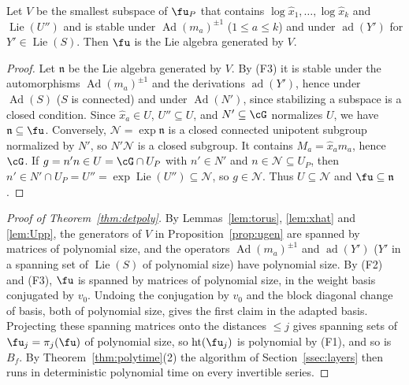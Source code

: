 \begin{proposition}\label{prop:ugen}
Let $V$ be the smallest subspace of $\fu_P$ that contains $\log\hat x_1,\ldots,\log\hat x_k$ and
$\operatorname{Lie}(U'')$ and is stable under $\operatorname{Ad}(m_a)^{\pm1}$ ($1\le a\le k$) and under $\operatorname{ad}(Y')$ for $Y'\in\operatorname{Lie}(S)$.
Then $\fu$ is the Lie algebra generated by $V$.
\end{proposition}
\begin{proof}
Let $\mathfrak n$ be the Lie algebra generated by $V$. By (F3) it is stable under the automorphisms
$\operatorname{Ad}(m_a)^{\pm1}$ and the derivations $\operatorname{ad}(Y')$, hence under $\operatorname{Ad}(S)$ ($S$ is connected) and under
$\operatorname{Ad}(N')$, since stabilizing a subspace is a closed condition. Since $\hat x_a\in U$, $U''\subseteq U$, and
$N'\subseteq\cG$ normalizes $U$, we have $\mathfrak n\subseteq\fu$. Conversely, $\mathcal N=\exp\mathfrak n$ is a closed
connected unipotent subgroup normalized by $N'$, so $N'\mathcal N$ is a closed subgroup. It contains
$M_a=\hat x_am_a$, hence $\cG$. If $g=n'n\in U=\cG\cap U_P$ with $n'\in N'$ and $n\in\mathcal N\subseteq U_P$, then
$n'\in N'\cap U_P=U''=\exp\operatorname{Lie}(U'')\subseteq\mathcal N$, so $g\in\mathcal N$. Thus $U\subseteq\mathcal N$ and
$\fu\subseteq\mathfrak n$.
\end{proof}

\begin{proof}[Proof of Theorem~\ref{thm:detpoly}]
By Lemmas~\ref{lem:torus}, \ref{lem:xhat} and \ref{lem:Upp}, the generators of $V$ in
Proposition~\ref{prop:ugen} are spanned by matrices of polynomial size, and the operators $\operatorname{Ad}(m_a)^{\pm1}$ and
$\operatorname{ad}(Y')$ ($Y'$ in a spanning set of $\operatorname{Lie}(S)$ of polynomial size) have polynomial size. By (F2) and (F3),
$\fu$ is spanned by matrices of polynomial size, in the weight basis conjugated by $v_0$. Undoing the
conjugation by $v_0$ and the block diagonal change of basis, both of polynomial size, gives the first
claim in the adapted basis. Projecting these spanning matrices onto the distances $\le j$ gives spanning sets
of $\fu_j=\pi_j(\fu)$ of polynomial size, so $\operatorname{ht}(\fu_j)$ is polynomial by (F1), and so is $B_f$. By
Theorem~\ref{thm:polytime}(2) the algorithm of Section~\ref{ssec:layers} then runs in deterministic polynomial
time on every invertible series.
\end{proof}

